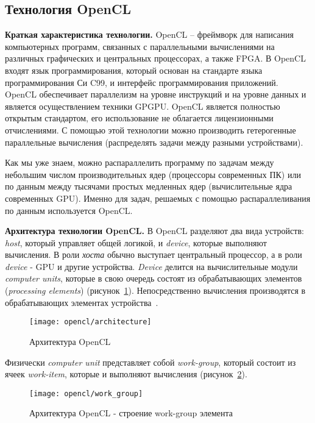 \subsection{Технология OpenCL}
\label{OpenCL:section}

\textbf{Краткая характеристика технологии.} OpenCL -- фреймворк для написания компьютерных программ, связанных с параллельными вычислениями на различных графических и центральных процессорах, а также FPGA. В OpenCL входят язык программирования, который основан на стандарте языка программирования Си C99, и интерфейс программирования приложений. OpenCL обеспечивает параллелизм на уровне инструкций и на уровне данных и является осуществлением техники GPGPU. OpenCL является полностью открытым стандартом, его использование не облагается лицензионными отчислениями. С помощью этой технологии можно производить гетерогенные параллельные вычисления (распределять задачи между разными устройствами).

Как мы уже знаем, можно распараллелить программу по задачам между небольшим числом производительных ядер (процессоры современных ПК) или по данным между тысячами простых медленных ядер (вычислительные ядра современных GPU). Именно для задач, решаемых с помощью распараллеливания по данным используется OpenCL\@.

\textbf{Архитектура технологии OpenCL.} В OpenCL разделяют два вида устройств: \textit{host}, который управляет общей логикой, и \textit{device}, которые выполняют вычисления. В роли \textit{хоста} обычно выступает центральный процессор, а в роли \textit{device} - GPU и другие устройства. \textit{Device} делится на вычислительные модули \textit{computer units}, которые в свою очередь состоят из обрабатывающих элементов (\textit{processing elements}) (рисунок~\ref{OpenCLArchitecture:image}). Непосредственно вычисления производятся в обрабатывающих элементах устройства~\cite{Bastrakov2011}.

\begin{figure}[H]
    \texttt{[image: opencl/architecture]}
    \caption{Архитектура OpenCL}
    \label{OpenCLArchitecture:image}
\end{figure}

Физически \textit{computer unit} представляет собой \textit{work-group}, который состоит из ячеек \textit{work-item}, которые и выполняют вычисления (рисунок~\ref{OpenCLWorkGroup:image}).

\begin{figure}[H]
    \texttt{[image: opencl/work\_group]}
    \caption{Архитектура OpenCL - строение work-group элемента}
    \label{OpenCLWorkGroup:image}
\end{figure}

